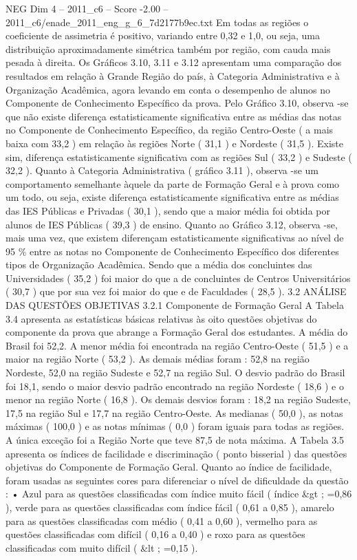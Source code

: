 \begin{textsample}{NEG Dim 4 – 2011\_c6 – Score -2.00 – 2011\_c6/enade\_2011\_eng\_g\_6\_7d2177b9ec.txt}
Em todas as regiões o coeficiente de assimetria é positivo, variando entre 0,32 e 1,0, ou seja, uma distribuição aproximadamente simétrica também por região, com cauda mais pesada à direita.
Os Gráficos 3.10, 3.11 e 3.12 apresentam uma comparação dos resultados em relação à Grande Região do país, à Categoria Administrativa e à Organização Acadêmica, agora levando em conta o desempenho de alunos no Componente de Conhecimento Específico da prova.
Pelo Gráfico 3.10, observa -se que não existe diferença estatisticamente significativa entre as médias das notas no Componente de Conhecimento Específico, da região Centro-Oeste ( a mais baixa com 33,2 ) em relação às regiões Norte ( 31,1 ) e Nordeste ( 31,5 ).
Existe sim, diferença estatisticamente significativa com as regiões Sul ( 33,2 ) e Sudeste ( 32,2 ).
Quanto à Categoria Administrativa ( gráfico 3.11 ), observa -se um comportamento semelhante àquele da parte de Formação Geral e à prova como um todo, ou seja, existe diferença estatisticamente significativa entre as médias das IES Públicas e Privadas ( 30,1 ), sendo que a maior média foi obtida por alunos de IES Públicas ( 39,3 ) de ensino.
Quanto ao Gráfico 3.12, observa -se, mais uma vez, que existem diferençam estatisticamente significativas ao nível de 95 \% entre as notas no Componente de Conhecimento Específico dos diferentes tipos de Organização Acadêmica.
Sendo que a média dos concluintes das Universidades ( 35,2 ) foi maior do que a de concluintes de Centros Universitários ( 30,7 ) que por sua vez foi maior do que e de Faculdades ( 28,5 ). 3.2 ANÁLISE DAS QUESTÕES OBJETIVAS 3.2.1 Componente de Formação Geral A Tabela 3.4 apresenta as estatísticas básicas relativas às oito questões objetivas do componente da prova que abrange a Formação Geral dos estudantes.
A média do Brasil foi 52,2.
A menor média foi encontrada na região Centro-Oeste ( 51,5 ) e a maior na região Norte ( 53,2 ).
As demais médias foram : 52,8 na região Nordeste, 52,0 na região Sudeste e 52,7 na região Sul.
O desvio padrão do Brasil foi 18,1, sendo o maior desvio padrão encontrado na região Nordeste ( 18,6 ) e o menor na região Norte ( 16,8 ).
Os demais desvios foram : 18,2 na região Sudeste, 17,5 na região Sul e 17,7 na região Centro-Oeste.
As medianas ( 50,0 ), as notas máximas ( 100,0 ) e as notas mínimas ( 0,0 ) foram iguais para todas as regiões.
A única exceção foi a Região Norte que teve 87,5 de nota máxima.
A Tabela 3.5 apresenta os índices de facilidade e discriminação ( ponto bisserial ) das questões objetivas do Componente de Formação Geral.
Quanto ao índice de facilidade, foram usadas as seguintes cores para diferenciar o nível de dificuldade da questão : • Azul para as questões classificadas com índice muito fácil ( índice \&gt ; =0,86 ), verde para as questões classificadas com índice fácil ( 0,61 a 0,85 ), amarelo para as questões classificadas com médio ( 0,41 a 0,60 ), vermelho para as questões classificadas com difícil ( 0,16 a 0,40 ) e roxo para as questões classificadas com muito difícil ( \&lt ; =0,15 ).

\end{textsample}
